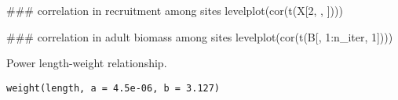 \documentclass[letterpaper]{book}
\begin{document}
\begin{Examples}
\begin{ExampleCode}
### correlation in recruitment among sites
levelplot(cor(t(X[2, , ])))

### correlation in adult biomass among sites
levelplot(cor(t(B[, 1:n_iter, 1])))





\end{ExampleCode}
\end{Examples}
%
\begin{Description}\relax
Power length-weight relationship.
\end{Description}
%
\begin{Usage}
\begin{verbatim}
weight(length, a = 4.5e-06, b = 3.127)
\end{verbatim}
\end{Usage}
\printindex{}
\end{document}
